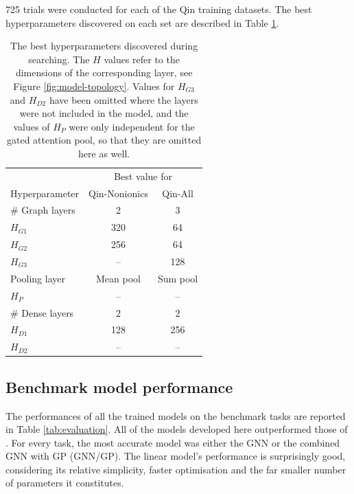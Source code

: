 \num{725} trials were conducted for each of the Qin training datasets. The best
hyperparameters discovered on each set are described in Table \ref{tab:hb-hps}.

\begin{table}
    \centering
    \caption{The best hyperparameters discovered during searching. The $H$
        values refer to the dimensions of the corresponding layer, see Figure
        \ref{fig:model-topology}. Values for $H_{G3}$ and $H_{D2}$ have been
        omitted where the layers were not included in the model, and the values
        of $H_P$ were only independent for the gated attention pool, so that
        they are omitted here as well.}
    \label{tab:hb-hps}
    \begin{tabular}{@{}lcc@{}} \toprule
                        & \multicolumn{2}{c}{Best value for}            \\\cmidrule(l){2-3}
        Hyperparameter  & Qin-Nonionics                      & Qin-All  \\\midrule
        \# Graph layers & 2                                  & 3        \\
        $H_{G1}$        & 320                                & 64       \\
        $H_{G2}$        & 256                                & 64       \\
        $H_{G3}$        & --                                 & 128      \\
        Pooling layer   & Mean pool                          & Sum pool \\
        $H_P$           & --                                 & --       \\
        \# Dense layers & 2                                  & 2        \\
        $H_{D1}$        & 128                                & 256      \\
        $H_{D2}$        & --                                 & --       \\\bottomrule
    \end{tabular}
\end{table}

\subsection{Benchmark model performance}

The performances of all the trained models on the benchmark tasks are reported
in Table \ref{tab:evaluation}. All of the models developed here outperformed
those of \citet{qinPredictingCriticalMicelle2021}. For every task, the most
accurate model was either the GNN or the combined GNN with GP (GNN/GP). The
linear model's performance is surprisingly good, considering its relative
simplicity, faster optimisation and the far smaller number of parameters it
constitutes.

